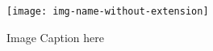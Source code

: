 \begin{figure}[H]
  \centering
  \texttt{[image: img-name-without-extension]}
  \caption{Image Caption here}
  \label{fig:label}
\end{figure}
